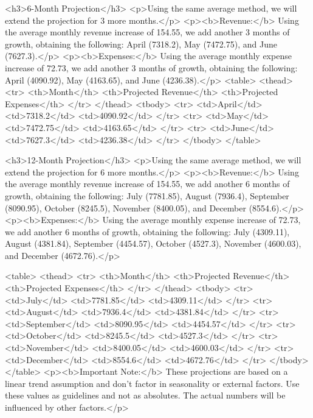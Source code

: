 {    <h3>6-Month Projection</h3>
      <p>Using the same average method, we will extend the projection for 3 more months.</p>
       <p><b>Revenue:</b> Using the average monthly revenue increase of 154.55, we add another 3 months of growth, obtaining the following: April (7318.2), May (7472.75), and June (7627.3).</p>
       <p><b>Expenses:</b> Using the average monthly expense increase of 72.73, we add another 3 months of growth, obtaining the following: April (4090.92), May (4163.65), and June (4236.38).</p>
        <table>
        <thead>
          <tr>
             <th>Month</th>
             <th>Projected Revenue</th>
             <th>Projected Expenses</th>
          </tr>
        </thead>
        <tbody>
          <tr>
              <td>April</td>
              <td>7318.2</td>
              <td>4090.92</td>
           </tr>
            <tr>
              <td>May</td>
              <td>7472.75</td>
              <td>4163.65</td>
           </tr>
            <tr>
              <td>June</td>
              <td>7627.3</td>
              <td>4236.38</td>
           </tr>
        </tbody>
      </table>

    <h3>12-Month Projection</h3>
       <p>Using the same average method, we will extend the projection for 6 more months.</p>
       <p><b>Revenue:</b> Using the average monthly revenue increase of 154.55, we add another 6 months of growth, obtaining the following: July (7781.85), August (7936.4), September (8090.95), October (8245.5), November (8400.05), and December (8554.6).</p>
       <p><b>Expenses:</b> Using the average monthly expense increase of 72.73, we add another 6 months of growth, obtaining the following: July (4309.11), August (4381.84), September (4454.57), October (4527.3), November (4600.03), and December (4672.76).</p>

    <table>
    <thead>
      <tr>
        <th>Month</th>
        <th>Projected Revenue</th>
        <th>Projected Expenses</th>
      </tr>
    </thead>
    <tbody>
      <tr>
          <td>July</td>
          <td>7781.85</td>
          <td>4309.11</td>
      </tr>
       <tr>
          <td>August</td>
          <td>7936.4</td>
          <td>4381.84</td>
        </tr>
       <tr>
          <td>September</td>
          <td>8090.95</td>
          <td>4454.57</td>
        </tr>
       <tr>
          <td>October</td>
          <td>8245.5</td>
          <td>4527.3</td>
      </tr>
       <tr>
          <td>November</td>
          <td>8400.05</td>
          <td>4600.03</td>
        </tr>
       <tr>
          <td>December</td>
          <td>8554.6</td>
          <td>4672.76</td>
        </tr>
    </tbody>
  </table>
  <p><b>Important Note:</b> These projections are based on a linear trend assumption and don't factor in seasonality or external factors. Use these values as guidelines and not as absolutes. The actual numbers will be influenced by other factors.</p>

}
